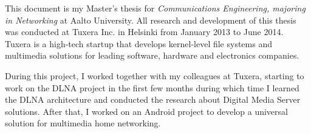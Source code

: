 
This document is my Master's thesis for \textit{Communications Engineering, majoring in
Networking} at Aalto University. All research and development of this thesis was
conducted at Tuxera Inc. in Helsinki from January 2013 to June 2014. Tuxera is a
high-tech startup that develops kernel-level file systems and multimedia solutions
for leading software, hardware and electronics companies.

During this project, I worked together with my colleagues at Tuxera, starting
to work on the DLNA project in the first few months during which time I learned
the DLNA architecture and conducted the research about Digital Media Server
solutions. After that, I worked on an Android project to develop a universal
solution for multimedia home networking.